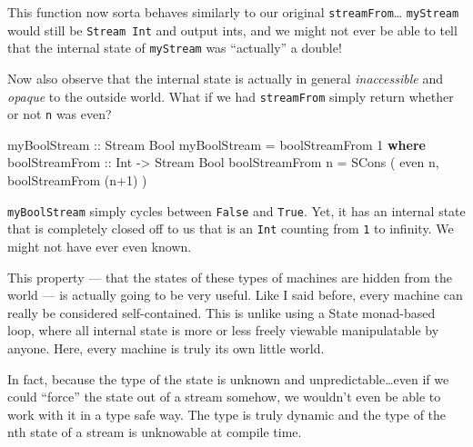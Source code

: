 \documentclass[]{article}
\newenvironment{Shaded}{}{}
\newcommand{\KeywordTok}[1]{\textcolor[rgb]{0.00,0.44,0.13}{\textbf{{#1}}}}
\newcommand{\DataTypeTok}[1]{\textcolor[rgb]{0.56,0.13,0.00}{{#1}}}
\newcommand{\DecValTok}[1]{\textcolor[rgb]{0.25,0.63,0.44}{{#1}}}
\newcommand{\OtherTok}[1]{\textcolor[rgb]{0.00,0.44,0.13}{{#1}}}
\newcommand{\FunctionTok}[1]{\textcolor[rgb]{0.02,0.16,0.49}{{#1}}}
\newcommand{\NormalTok}[1]{{#1}}
\begin{document}
This function now sorta behaves similarly to our original
\texttt{streamFrom}\ldots{} \texttt{myStream\textquotesingle{}} would
still be \texttt{Stream\ Int} and output ints, and we might not ever be
able to tell that the internal state of
\texttt{myStream\textquotesingle{}} was ``actually'' a double!

Now also observe that the internal state is actually in general
\emph{inaccessible} and \emph{opaque} to the outside world. What if we
had \texttt{streamFrom} simply return whether or not \texttt{n} was
even?

\begin{Shaded}
\begin{Highlighting}[]
\OtherTok{myBoolStream ::} \DataTypeTok{Stream} \DataTypeTok{Bool}
\NormalTok{myBoolStream }\FunctionTok{=} \NormalTok{boolStreamFrom }\DecValTok{1}
  \KeywordTok{where}
\OtherTok{    boolStreamFrom ::} \DataTypeTok{Int} \OtherTok{->} \DataTypeTok{Stream} \DataTypeTok{Bool}
    \NormalTok{boolStreamFrom n }\FunctionTok{=} \DataTypeTok{SCons} \NormalTok{( even n, boolStreamFrom (n}\FunctionTok{+}\DecValTok{1}\NormalTok{) )}
\end{Highlighting}
\end{Shaded}

\begin{Shaded}
\end{Shaded}

\texttt{myBoolStream} simply cycles between \texttt{False} and
\texttt{True}. Yet, it has an internal state that is completely closed
off to us that is an \texttt{Int} counting from \texttt{1} to infinity.
We might not have ever even known.

This property --- that the states of these types of machines are hidden
from the world --- is actually going to be very useful. Like I said
before, every machine can really be considered self-contained. This is
unlike using a State monad-based loop, where all internal state is more
or less freely viewable manipulatable by anyone. Here, every machine is
truly its own little world.

In fact, because the type of the state is unknown and
unpredictable\ldots{}even if we could ``force'' the state out of a
stream somehow, we wouldn't even be able to work with it in a type safe
way. The type is truly dynamic and the type of the nth state of a stream
is unknowable at compile time.
\end{document}
